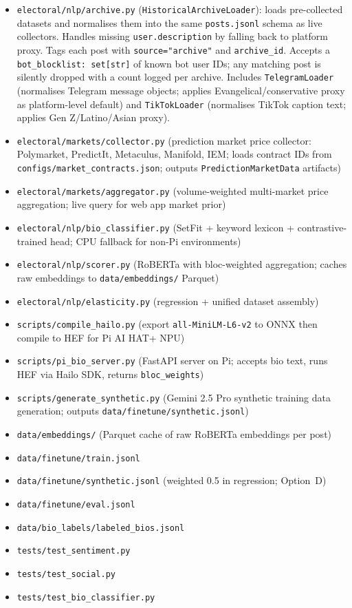 \documentclass[11pt]{article}
\begin{document}
\begin{itemize}[leftmargin=1.6em, itemsep=2pt]
{        in April 2023. Do not use them.})
  \item \texttt{electoral/nlp/archive.py} (\texttt{HistoricalArchiveLoader}):
        loads pre-collected datasets and normalises them into the same
        \texttt{posts.jsonl} schema as live collectors. Handles missing
        \texttt{user.description} by falling back to platform proxy.
        Tags each post with \texttt{source="archive"} and \texttt{archive\_id}.
        Accepts a \texttt{bot\_blocklist: set[str]} of known bot user IDs;
        any matching post is silently dropped with a count logged per archive.
        Includes \texttt{TelegramLoader} (normalises Telegram message objects;
        applies Evangelical/conservative proxy as platform-level default) and
        \texttt{TikTokLoader} (normalises TikTok caption text; applies
        Gen Z/Latino/Asian proxy).
  \item \texttt{electoral/markets/collector.py} (prediction market price collector:
        Polymarket, PredictIt, Metaculus, Manifold, IEM; loads contract IDs
        from \texttt{configs/market\_contracts.json}; outputs
        \texttt{PredictionMarketData} artifacts)
  \item \texttt{electoral/markets/aggregator.py} (volume-weighted multi-market
        price aggregation; live query for web app market prior)
  \item \texttt{electoral/nlp/bio\_classifier.py} (SetFit + keyword lexicon
        + contrastive-trained head; CPU fallback for non-Pi environments)
  \item \texttt{electoral/nlp/scorer.py} (RoBERTa with bloc-weighted aggregation;
        caches raw embeddings to \texttt{data/embeddings/} Parquet)
  \item \texttt{electoral/nlp/elasticity.py} (regression + unified dataset assembly)
  \item \texttt{scripts/compile\_hailo.py} (export \texttt{all-MiniLM-L6-v2} to
        ONNX then compile to HEF for Pi AI HAT+ NPU)
  \item \texttt{scripts/pi\_bio\_server.py} (FastAPI server on Pi; accepts bio text,
        runs HEF via Hailo SDK, returns \texttt{bloc\_weights})
  \item \texttt{scripts/generate\_synthetic.py} (Gemini 2.5 Pro synthetic training
        data generation; outputs \texttt{data/finetune/synthetic.jsonl})
  \item \texttt{data/embeddings/} (Parquet cache of raw RoBERTa embeddings per post)
  \item \texttt{data/finetune/train.jsonl}
  \item \texttt{data/finetune/synthetic.jsonl} (weighted 0.5 in regression; Option~D)
  \item \texttt{data/finetune/eval.jsonl}
  \item \texttt{data/bio\_labels/labeled\_bios.jsonl}
  \item \texttt{tests/test\_sentiment.py}
  \item \texttt{tests/test\_social.py}
  \item \texttt{tests/test\_bio\_classifier.py}
\end{itemize}
\end{document}
